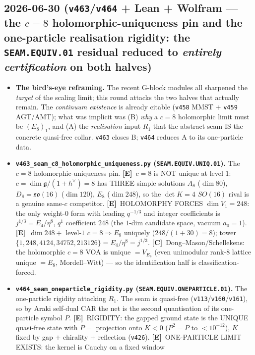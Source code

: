 \documentclass[11pt]{article}
\providecommand{\mE}{\textbf{[E]}}\providecommand{\mC}{\textbf{[C]}}
\begin{document}
\subsection*{2026-06-30 (\texttt{v463}/\texttt{v464} + Lean + Wolfram --- the $c{=}8$ holomorphic-uniqueness pin and the one-particle realisation rigidity: the \texttt{SEAM.EQUIV.01} residual reduced to \emph{entirely certification} on both halves)}
\begin{itemize}
\item \textbf{The bird's-eye reframing.} The recent G-block modules all sharpened the \emph{target} of the
scaling limit; this round attacks the two halves that actually remain. The \emph{continuum existence} is already
citable (\texttt{v458} MMST $+$ \texttt{v459} AGT/AMT); what was implicit was (B) \emph{why} a $c{=}8$ holomorphic
limit must be $(E_8)_1$, and (A) the \emph{realisation} input $R_1$ that the abstract seam IS the concrete quasi-free
collar. \texttt{v463} closes B; \texttt{v464} reduces A to its one-particle data.
\item \textbf{\texttt{v463\_seam\_c8\_holomorphic\_uniqueness.py} (\texttt{SEAM.EQUIV.UNIQ.01}).} The $c{=}8$
holomorphic-uniqueness pin. \mE\ $c{=}8$ is NOT unique at level $1$: $c{=}\dim\mathfrak g/(1{+}h^\vee){=}8$ has THREE
simple solutions $A_8$ ($\dim 80$), $D_8{=}\mathfrak{so}(16)$ ($\dim 120$), $E_8$ ($\dim 248$), so the $\det K{=}4$
$SO(16)$ rival is a genuine same-$c$ competitor. \mE\ HOLOMORPHY FORCES $\dim V_1{=}248$: the only weight-$0$ form with
leading $q^{-1/3}$ and integer coefficients is $j^{1/3}{=}E_4/\eta^8$, $q^1$ coefficient $248$ (the $1$-dim candidate
space, vacuum $a_0{=}1$). \mE\ $\dim 248 + $ level-$1$ $c{=}8 \Rightarrow E_8$ uniquely ($248/(1{+}30){=}8$);
tower $\{1,248,4124,34752,213126\}{=}E_4/\eta^8{=}j^{1/3}$. \mC\ Dong--Mason/Schellekens: the holomorphic $c{=}8$ VOA is
unique $={}V_{E_8}$ (even unimodular rank-$8$ lattice unique $={}E_8$, Mordell--Witt) --- so the identification half is
classification-forced.
\item \textbf{\texttt{v464\_seam\_oneparticle\_rigidity.py} (\texttt{SEAM.EQUIV.ONEPARTICLE.01}).} The one-particle
rigidity attacking $R_1$. The seam is quasi-free (\texttt{v113}/\texttt{v160}/\texttt{v161}), so by Araki self-dual
CAR the net is the second quantisation of its one-particle symbol $P$. \mE\ RIGIDITY: the gapped ground state is the
UNIQUE quasi-free state with $P{=}$ projection onto $K{<}0$ ($P^2{=}P$ to $<10^{-12}$), $K$ fixed by gap $+$ chirality
$+$ reflection (\texttt{v426}). \mE\ ONE-PARTICLE LIMIT EXISTS: the kernel is Cauchy on a fixed window

\end{itemize}
\end{document}

